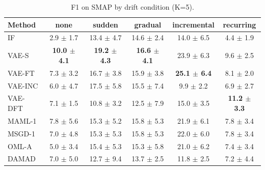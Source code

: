 \begin{table}[t]
\centering
\small
\caption{F1 on SMAP by drift condition (K=5).}
\label{tab:drift_f1_smap}
\begin{tabular}{lccccc}
\toprule
Method & none & sudden & gradual & incremental & recurring \\
\midrule
IF & 2.9 $\pm$ 1.7 & 13.4 $\pm$ 4.7 & 14.6 $\pm$ 2.4 & 14.0 $\pm$ 6.5 & 4.4 $\pm$ 1.9 \\
VAE-S & \textbf{10.0 $\pm$ 4.1} & \textbf{19.2 $\pm$ 4.3} & \textbf{16.6 $\pm$ 4.1} & 23.9 $\pm$ 6.3 & 9.6 $\pm$ 2.5 \\
VAE-FT & 7.3 $\pm$ 3.2 & 16.7 $\pm$ 3.8 & 15.9 $\pm$ 3.8 & \textbf{25.1 $\pm$ 6.4} & 8.1 $\pm$ 2.0 \\
VAE-INC & 6.0 $\pm$ 4.7 & 17.5 $\pm$ 5.8 & 15.5 $\pm$ 7.4 & 9.9 $\pm$ 2.2 & 6.9 $\pm$ 2.7 \\
VAE-DFT & 7.1 $\pm$ 1.5 & 10.8 $\pm$ 3.2 & 12.5 $\pm$ 7.9 & 15.0 $\pm$ 3.5 & \textbf{11.2 $\pm$ 3.3} \\
MAML-1 & 7.8 $\pm$ 5.6 & 15.3 $\pm$ 5.2 & 15.8 $\pm$ 5.3 & 21.9 $\pm$ 6.1 & 7.8 $\pm$ 3.4 \\
MSGD-1 & 7.0 $\pm$ 4.8 & 15.3 $\pm$ 5.3 & 15.8 $\pm$ 5.3 & 22.0 $\pm$ 6.0 & 7.8 $\pm$ 3.4 \\
OML-A & 5.0 $\pm$ 3.4 & 15.4 $\pm$ 5.3 & 15.3 $\pm$ 5.8 & 21.0 $\pm$ 6.2 & 7.4 $\pm$ 3.4 \\
DAMAD & 7.0 $\pm$ 5.0 & 12.7 $\pm$ 9.4 & 13.7 $\pm$ 2.5 & 11.8 $\pm$ 2.5 & 7.2 $\pm$ 4.4 \\
\bottomrule
\end{tabular}
\end{table}

